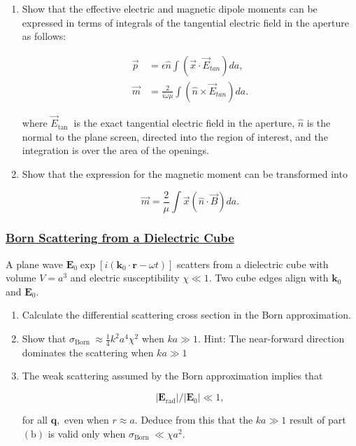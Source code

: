 \begin{enumerate}
	\item Show that the effective electric and magnetic dipole moments can be expressed in terms of integrals of the tangential electric field in the aperture as follows:

	\begin{subequations}
		\begin{align}
			\vec{p} &=\epsilon \hat{n} \int\left(\vec{x} \cdot \vec{E}_{t a n}\right) d a, \\
			\vec{m}&= \frac{2}{i \omega \mu} \int\left(\hat{n} \times \vec{E}_{t a n}\right) d a.
		\end{align}
	\end{subequations}

	where $\vec{E}_{\text {tan }}$ is the exact tangential electric field in the aperture, $\hat{n}$ is the normal to the plane screen, directed into the region of interest, and the integration is over the area of the openings.
	\item  Show that the expression for the magnetic moment can be transformed into
	
	\begin{equation}
		\vec{m}=\frac{2}{\mu} \int \vec{x}(\hat{n} \cdot \vec{B}) d a.
	\end{equation}
\end{enumerate}

\subsubsection{\hyperref[Born Scattering from a Dielectric Cube]{Born Scattering from a Dielectric Cube}} 

A plane wave $\mathbf{E}_{0} \exp \left[i\left(\mathbf{k}_{0} \cdot \mathbf{r}-\omega t\right)\right]$ scatters from a dielectric cube with volume $V=a^{3}$ and electric susceptibility $\chi \ll 1$. Two cube edges align with $\mathbf{k}_{0}$ and $\mathbf{E}_{0}$.

\begin{enumerate}
	\item Calculate the differential scattering cross section in the Born approximation.
	\item Show that $\sigma_{\text {Born }} \approx \frac{1}{4} k^{2} a^{4} \chi^{2}$ when $k a \gg 1$. Hint: The near-forward direction dominates the scattering when $k a \gg 1$
	\item The weak scattering assumed by the Born approximation implies that 
	
	\begin{equation}
		\left|\mathbf{E}_{\mathrm{rad}}\right| /\left|\mathbf{E}_{0}\right| \ll 1,
	\end{equation}

	 for all $\mathbf{q},$ even when $r \approx a .$ Deduce from this that the $k a \gg 1$ result of part $(\mathrm{b})$ is valid only when $\sigma_{\text {Born }} \ll \chi a^{2}$.
\end{enumerate}

